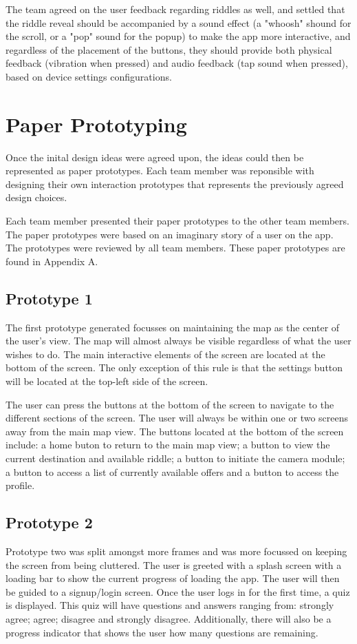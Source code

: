\documentclass[10pt,twocolumn]{article} %
\begin{document}
The team agreed on the user feedback regarding riddles as well, and settled that the riddle reveal should be accompanied by a sound effect (a "whoosh" shound for the scroll, or a "pop" sound for the popup) to make the app more interactive, and regardless of the placement of the buttons, they should provide both physical feedback (vibration when pressed) and audio feedback (tap sound when pressed), based on device settings configurations.
\section*{Paper Prototyping}
Once the inital design ideas were agreed upon, the ideas could then be represented as paper prototypes. Each team member was reponsible with designing their own interaction prototypes that represents the previously agreed design choices.

Each team member presented their paper prototypes to the other team members. The paper prototypes were based on an imaginary story of a user on the app. The prototypes were reviewed by all team members. These paper prototypes are found in Appendix A.

\subsection*{Prototype 1}
The first prototype generated focusses on maintaining the map as the center of the user's view. The map will almost always be visible regardless of what the user wishes to do. The main interactive elements of the screen are located at the bottom of the screen. The only exception of this rule is that the settings button will be located at the top-left side of the screen.

The user can press the buttons at the bottom of the screen to navigate to the different sections of the screen. The user will always be within one or two screens away from the main map view. The buttons located at the bottom of the screen include: a home buton to return to the main map view; a button to view the current destination and available riddle; a button to initiate the camera module; a button to access a list of currently available offers and a button to access the profile.

\subsection*{Prototype 2}
Prototype two was split amongst more frames and was more focussed on keeping the screen from being cluttered. The user is greeted with a splash screen with a loading bar to show the current progress of loading the app. The user will then be guided to a signup/login screen. Once the user logs in for the first time, a quiz is displayed. This quiz will have questions and answers ranging from: strongly agree; agree; disagree and strongly disagree. Additionally, there will also be a progress indicator that shows the user how many questions are remaining. 
\end{document}
